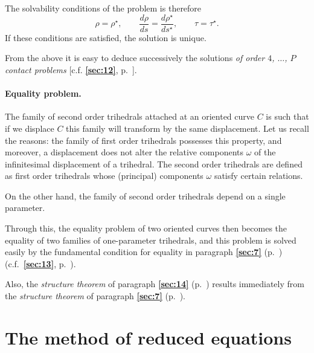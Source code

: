 \documentclass[leqno,11pt]{book}
\numberwithin{equation}{chapter}
\theoremstyle{shape1}
\theoremstyle{shapesmall}
\newcommand{\fsref}[1]{{\rm\textsection\textbf{\ref{sec:#1}}}}
\newcommand{\str}{^{\star}}
\begin{document}
The solvability conditions of the problem is therefore
\[
\rho=\rho\str,\qquad\frac{d\rho}{ds}=\frac{d\rho\str}{ds\str},\qquad\tau=\tau\str.
\]
If these conditions are satisfied, the solution is unique.

From the above it is easy to deduce successively the solutions \emph{of order $4$, $\dots$, $P$ contact problems} [c.f. \fsref{12}, p.~\pageref{sec:12}].

\paragraph{Equality problem.}
\label{sec:21}
The family of second order trihedrals attached at an oriented curve $C$ is such that if we displace $C$ this family will transform by the same displacement. Let us recall the reasons: the family of first order trihedrals possesses this property, and moreover, a displacement does not alter the relative components $\omega$ of the infinitesimal displacement of a trihedral. The second order trihedrals are defined as first order trihedrals whose (principal) components $\omega$ satisfy certain relations.

On the other hand, the family of second order trihedrals depend on a single parameter.

Through this, the equality problem of two oriented curves then becomes the equality of two families of one-parameter trihedrals, and this problem is solved easily by the fundamental condition for equality in paragraph \fsref{7} (p.~\pageref{sec:7}) (c.f.~\fsref{13}, p.~\pageref{sec:13}).

Also, the \emph{structure theorem} of paragraph \fsref{14} (p.~\pageref{sec:14}) results immediately from the \emph{structure theorem} of paragraph \fsref{7} (p.~\pageref{sec:7}).



\section{The method of reduced equations}
\label{sec:meth-reduc-equat}

\addtocounter{paragraph}{-1}
\end{document}
